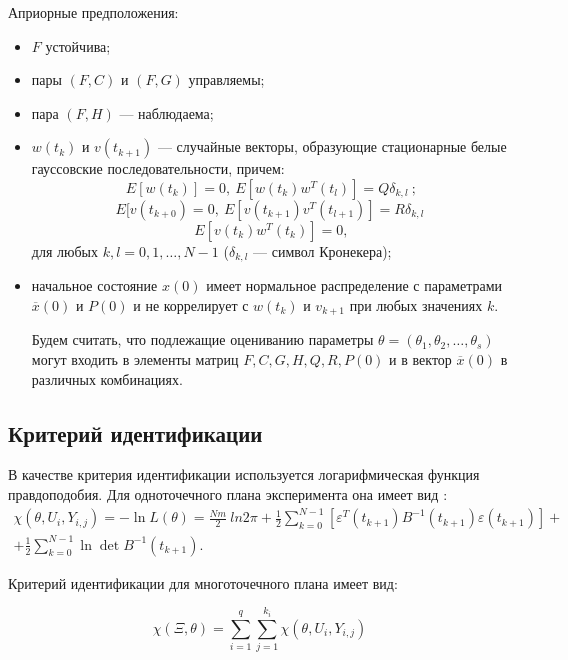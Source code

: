 \documentclass[a4paper,14pt]{extarticle}
\renewcommand{\vec}[1]{#1}
\newcommand{\eps}{\varepsilon}
\begin{document}
\bigskip
Априорные предположения:
\begin{itemize}
\item $F$ устойчива;
\item пары $(F, C)$ и $(F, G)$ управляемы;
\item пара $(F, H)$ --- наблюдаема;
\item $\vec{w}(t_k)$ и $\vec{v}(t_{k+1})$ --- случайные векторы, образующие
стационарные белые гауссовские последовательности, причем:
\[
E[\vec{w}(t_k)] = 0,\ E[\vec{w}(t_k)\vec{w}^{T}(t_l)] = Q \delta_{k,l}\ ;
\]
\[
E[\vec{v}(t_{k+0}) = 0,\ E[\vec{v}(t_{k+1})\vec{v}^{T}(t_{l+1})] = R
\delta_{k,l}\;
\]
\[
E[\vec{v}(t_k)\vec{w}^{T}(t_k)] = 0,
\]
для любых $k, l = 0, 1, \ldots, N-1$ ($\delta_{k,l}$ --- символ Кронекера);

\item начальное состояние $\vec{x}(0)$ имеет нормальное распределение с
параметрами $\overline{\vec{x}}(0)$ и $P(0)$ и не коррелирует с $\vec{w(t_k)}$
и $\vec{v_{k+1}}$ при любых значениях $k$.

Будем считать, что подлежащие оцениванию параметры $\theta = (\theta_1,
\theta_2, \ldots, \theta_s)$ могут входить в элементы матриц $F, C, G, H, Q, R,
P(0)$ и в вектор $\overline{\vec{x}}(0)$ в различных комбинациях.

\end{itemize}

\subsection{Критерий идентификации}

В качестве критерия идентификации используется логарифмическая функция
правдоподобия. Для одноточечного плана эксперимента она имеет вид \cite{mono}:
\begin{equation*}
\begin{split}
	\chi(\theta, U_i, Y_{i,j}) = -\ln{L(\theta)} = \frac{Nm}{2}\ ln{2\pi} + \frac{1}{2}
  \sum\limits_{k=0}^{N-1} \left[ \eps^T(t_{k+1}) B^{-1}(t_{k+1}) \eps(t_{k+1}) \right]
  + \\ + \frac{1}{2} \sum\limits_{k=0}^{N-1} \ln \det B^{-1}(t_{k+1}).
\end{split}
\end{equation*}

Критерий идентификации для многоточечного плана имеет вид:

\begin{equation*}
	\chi(\Xi, \theta) =
		\sum\limits_{i=1}^{q} \sum\limits_{j=1}^{k_i} \chi(\theta, U_i, Y_{i,j})
\end{equation*}
\end{document}
